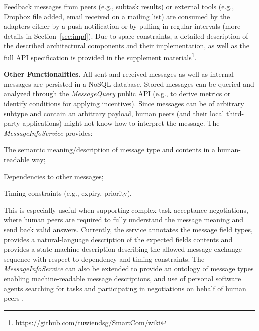 \documentclass{llncs}
\begin{document}
    Feedback messages from peers (e.g., subtask results) or external tools (e.g., Dropbox file added, email received on a mailing list) are consumed by the adapters either by a push notification or by pulling in regular intervals (more details in Section~\ref{sec:impl}). 
    Due to space constraints, a detailed description of the described architectural components and their implementation, as well as the full API specification is provided in the supplement materials\footnote{\url{https://github.com/tuwiendsg/SmartCom/wiki}}.

  \textbf{Other Functionalities.}
    All sent and received messages as well as internal messages are persisted in a NoSQL database. Stored messages can be queried and analyzed through the \emph{MessageQuery} public API (e.g., to derive metrics or identify conditions for applying incentives).
    Since messages can be of arbitrary subtype and contain an arbitrary payload, human peers (and their local third-party applications) might not know how to interpret the message. The \emph{MessageInfoService} provides:
    \begin{inparaenum}[\itshape a)]
        \item The semantic meaning/description of message type and contents in a human-readable way; 
        \item Dependencies to other messages;
        \item Timing constraints (e.g., expiry, priority).
    \end{inparaenum}
    This is especially useful when supporting complex task acceptance negotiations, where human peers are required to fully understand the message meaning and send back valid answers. 
    Currently, the service annotates the message field types, provides a natural-language description of the expected fields contents and provides a state-machine description describing the allowed message exchange sequence with respect to dependency and timing constraints. The \emph{MessageInfoService} can also be extended to provide an ontology of message types enabling machine-readable message descriptions, and use of personal software agents searching for tasks and participating in negotiations on behalf of human peers \cite{KobiGal}. 
\end{document}
